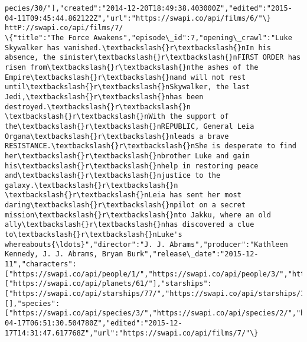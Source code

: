 \documentclass[11pt]{article}
\begin{document}
\begin{Verbatim}[commandchars=\\\{\}]
pecies/30/"],"created":"2014-12-20T18:49:38.403000Z","edited":"2015-04-11T09:45:44.862122Z","url":"https://swapi.co/api/films/6/"\}
httP://swapi.co/api/films/7/
\{"title":"The Force Awakens","episode\_id":7,"opening\_crawl":"Luke Skywalker has vanished.\textbackslash{}r\textbackslash{}nIn his absence, the sinister\textbackslash{}r\textbackslash{}nFIRST ORDER has risen from\textbackslash{}r\textbackslash{}nthe ashes of the Empire\textbackslash{}r\textbackslash{}nand will not rest until\textbackslash{}r\textbackslash{}nSkywalker, the last Jedi,\textbackslash{}r\textbackslash{}nhas been destroyed.\textbackslash{}r\textbackslash{}n \textbackslash{}r\textbackslash{}nWith the support of the\textbackslash{}r\textbackslash{}nREPUBLIC, General Leia Organa\textbackslash{}r\textbackslash{}nleads a brave RESISTANCE.\textbackslash{}r\textbackslash{}nShe is desperate to find her\textbackslash{}r\textbackslash{}nbrother Luke and gain his\textbackslash{}r\textbackslash{}nhelp in restoring peace and\textbackslash{}r\textbackslash{}njustice to the galaxy.\textbackslash{}r\textbackslash{}n \textbackslash{}r\textbackslash{}nLeia has sent her most daring\textbackslash{}r\textbackslash{}npilot on a secret mission\textbackslash{}r\textbackslash{}nto Jakku, where an old ally\textbackslash{}r\textbackslash{}nhas discovered a clue to\textbackslash{}r\textbackslash{}nLuke's whereabouts{\ldots}","director":"J. J. Abrams","producer":"Kathleen Kennedy, J. J. Abrams, Bryan Burk","release\_date":"2015-12-11","characters":["https://swapi.co/api/people/1/","https://swapi.co/api/people/3/","https://swapi.co/api/people/5/","https://swapi.co/api/people/13/","https://swapi.co/api/people/14/","https://swapi.co/api/people/27/","https://swapi.co/api/people/84/","https://swapi.co/api/people/85/","https://swapi.co/api/people/86/","https://swapi.co/api/people/87/","https://swapi.co/api/people/88/"],"planets":["https://swapi.co/api/planets/61/"],"starships":["https://swapi.co/api/starships/77/","https://swapi.co/api/starships/10/"],"vehicles":[],"species":["https://swapi.co/api/species/3/","https://swapi.co/api/species/2/","https://swapi.co/api/species/1/"],"created":"2015-04-17T06:51:30.504780Z","edited":"2015-12-17T14:31:47.617768Z","url":"https://swapi.co/api/films/7/"\}

    \end{Verbatim}
\end{document}
